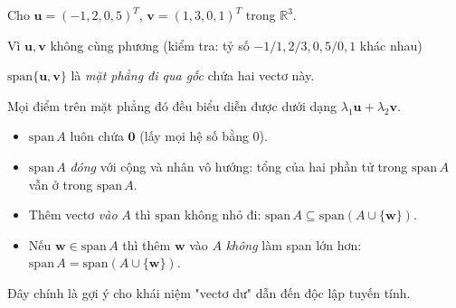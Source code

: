 \documentclass[12pt,a4paper]{article}
\begin{document}
\begin{vidu}[title={Span trong $\mathbb{R}^3$ -- mặt phẳng đi qua gốc}]
Cho $\mathbf{u} = (-1, 2, 0{,}5)^T$, $\mathbf{v} = (1, 3, 0{,}1)^T$ trong $\mathbb{R}^3$.

Vì $\mathbf{u}, \mathbf{v}$ không cùng phương (kiểm tra: tỷ số $-1/1, 2/3, 0{,}5/0{,}1$ khác nhau)

$\mathrm{span}\{\mathbf{u}, \mathbf{v}\}$ là \emph{mặt phẳng đi qua gốc} chứa hai vectơ này.

\medskip
\begin{center}
\end{center}
Mọi điểm trên mặt phẳng đó đều biểu diễn được dưới dạng $\lambda_1\mathbf{u} + \lambda_2\mathbf{v}$.
\end{vidu}

\begin{tinhchat}[title={Tính chất của Không gian sinh}]
\begin{itemize}
  \item $\mathrm{span}\,A$ luôn chứa $\mathbf{0}$ (lấy mọi hệ số bằng 0).
  \item $\mathrm{span}\,A$ \emph{đóng} với cộng và nhân vô hướng: tổng của hai phần tử trong $\mathrm{span}\,A$ vẫn ở trong $\mathrm{span}\,A$.
  \item Thêm vectơ \emph{vào} $A$ thì $\mathrm{span}$ không nhỏ đi: $\mathrm{span}\,A \subseteq \mathrm{span}(A \cup \{\mathbf{w}\})$.
  \item Nếu $\mathbf{w} \in \mathrm{span}\,A$ thì thêm $\mathbf{w}$ vào $A$ \emph{không} làm span lớn hơn: $\mathrm{span}\,A = \mathrm{span}(A \cup \{\mathbf{w}\})$.
\end{itemize}
Đây chính là gợi ý cho khái niệm "vectơ dư" dẫn đến độc lập tuyến tính.
\end{tinhchat}
\end{document}
